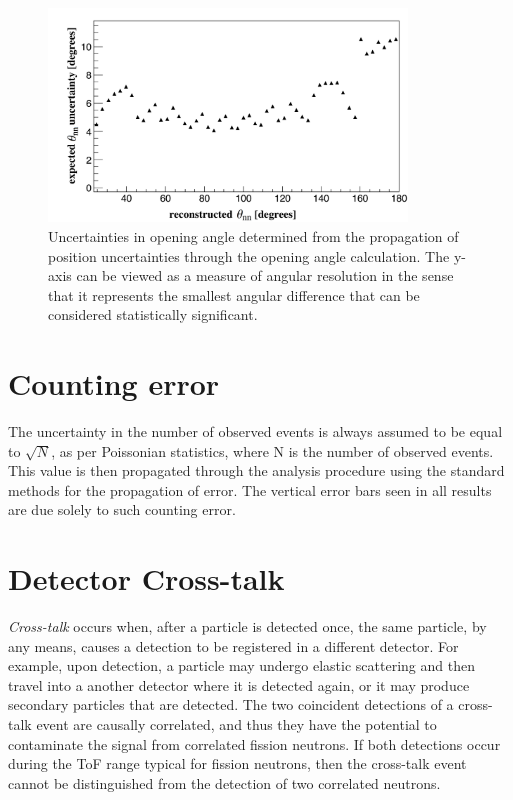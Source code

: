 \begin{figure}[h]
    \centering
    \includegraphics[width = 0.85\textwidth]{Content/Errors/OpeningAngleUncertainty.png}
    \caption{Uncertainties in opening angle determined from the propagation of position uncertainties through the opening angle calculation.
    The y-axis can be viewed as a measure of angular resolution in the sense that it represents the smallest angular difference that can be considered statistically significant.
    }
    \label{fig:OpeningAngleRes}
\end{figure}

\section{Counting error}
The uncertainty in the number of observed events is always assumed to be equal to $\sqrt{N}$, as per Poissonian  statistics, where N is the number of observed events.
This value is then propagated through the analysis procedure using the standard methods for the propagation of error.
The vertical error bars seen in all results are due solely to such counting error.

\FloatBarrier
\section{Detector Cross-talk}
\label{crosstalk}
\textit{Cross-talk} occurs when, after a particle is detected once, the same particle, by any means, causes a detection to be registered in a different detector.
For example, upon detection, a particle may undergo elastic scattering and then travel into a another detector where it is detected again, or it may produce secondary particles that are detected.
The two coincident detections of a cross-talk event are causally correlated, and thus they have the potential to contaminate the signal from correlated fission neutrons.
If both detections occur during the ToF range typical for fission neutrons, then the cross-talk event cannot be distinguished from the detection of two correlated neutrons.

